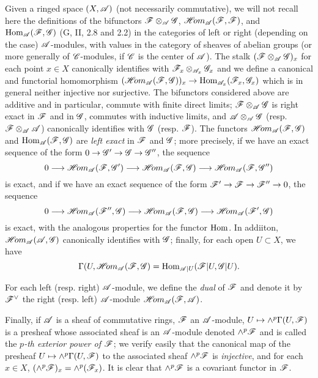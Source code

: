 \begin{env}[4.1.5]
\label{0.4.1.5}
Given a ringed space $(X,\mathscr{A})$ (not necessarily commutative), we will not
recall here the definitions of the bifunctors $\mathscr{F}\otimes_\mathscr{A}\mathscr{G}$,
$\mathscr{H}\!{om}_\mathscr{A}(\mathscr{F},\mathscr{F})$, and ${\mathop{\mathrm{Hom}}\nolimits}_\mathscr{A}(\mathscr{F},\mathscr{G})$
(G, II, 2.8 and 2.2) in the categories of left or right (depending on the case)
$\mathscr{A}$-modules, with values in the category of sheaves of abelian groups (or
more generally of $\mathscr{C}$-modules, if $\mathscr{C}$ is the center of $\mathscr{A}$). The
stalk $(\mathscr{F}\otimes_\mathscr{A}\mathscr{G})_x$ for each point $x\in X$ canonically
identifies with $\mathscr{F}_x\otimes_{\mathscr{A}_x}\mathscr{G}_x$ and we define a canonical
and functorial homomorphism
$(\shHom_\sh{A}(\sh{F},\sh{G}))_x\to\Hom_{\sh{A}_x}(\sh{F}_x,\sh{G}_x)$ which is
in general neither injective nor surjective. The bifunctors considered above are
additive and in particular, commute with finite direct limits;
$\mathscr{F}\otimes_\mathscr{A}\mathscr{G}$ is right exact in $\mathscr{F}$ and in $\mathscr{G}$,
commutes with inductive limits, and $\mathscr{A}\otimes_\mathscr{A}\mathscr{G}$
(resp. $\mathscr{F}\otimes_\mathscr{A}\mathscr{A}$) canonically identifies with $\mathscr{G}$
(resp. $\mathscr{F}$). The functors $\mathscr{H}\!{om}_\mathscr{A}(\mathscr{F},\mathscr{G})$ and
${\mathop{\mathrm{Hom}}\nolimits}_\mathscr{A}(\mathscr{F},\mathscr{G})$ are \emph{left exact} in $\mathscr{F}$ and $\mathscr{G}$;
more precisely, if we have an exact sequence of the form
$0\to\sh{G}'\to\sh{G}\to\sh{G}''$, the sequence
\[
  0\to\shHom_\sh{A}(\sh{F},\sh{G}')\to
  \shHom_\sh{A}(\sh{F},\sh{G})\to\shHom_\sh{A}(\sh{F},\sh{G}'')
\]
is exact, and if we have an exact sequence of the form
$\sh{F}'\to\sh{F}\to\sh{F}''\to 0$, the sequence
\[
  0\to\shHom_\sh{A}(\sh{F}'',\sh{G})\to
  \shHom_\sh{A}(\sh{F},\sh{G})\to\shHom_\sh{A}(\sh{F}',\sh{G})
\]
is exact, with the analogous properties for the functor ${\mathop{\mathrm{Hom}}\nolimits}$. In addiiton,
$\mathscr{H}\!{om}_\mathscr{A}(\mathscr{A},\mathscr{G})$ canonically identifies with $\mathscr{G}$; finally,
for each open $U\subset X$, we have
\[
  \Gamma(U,\mathscr{H}\!{om}_\mathscr{A}(\mathscr{F},\mathscr{G})={\mathop{\mathrm{Hom}}\nolimits}_{\mathscr{A}|U}(\mathscr{F}|U,\mathscr{G}|U).
\]

For each left (resp. right) $\mathscr{A}$-module, we define the \emph{dual} of
$\mathscr{F}$ and denote it by ${\mathscr{F}}^\vee$ the right (resp. left) $\mathscr{A}$-module
$\mathscr{H}\!{om}_\mathscr{A}(\mathscr{F},\mathscr{A})$.

Finally, if $\mathscr{A}$ is a sheaf of commutative rings, $\mathscr{F}$ an
$\mathscr{A}$-module, $U\mapsto\wedge^p\Gamma(U,\sh{F})$ is a presheaf whose
associated sheaf is an $\mathscr{A}$-module denoted $\wedge^p\mathscr{F}$ and is called
the \emph{$p$-th exterior power of $\mathscr{F}$}; we verify easily that the
canonical map of the presheaf $U\mapsto\wedge^p\Gamma(U,\sh{F})$ to the
associated sheaf $\wedge^p\mathscr{F}$ is \emph{injective}, and for each $x\in X$,
$(\wedge^p\mathscr{F})_x=\wedge^p(\mathscr{F}_x)$. It is clear that $\wedge^p\mathscr{F}$ is a
covariant functor in $\mathscr{F}$.
\end{env}

